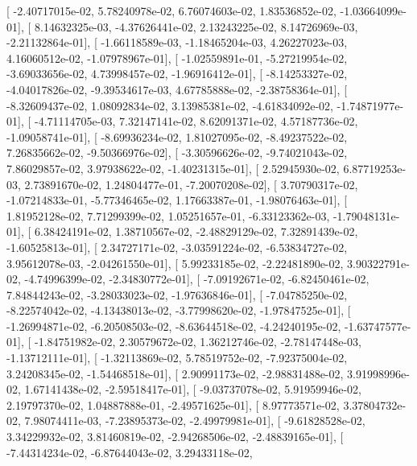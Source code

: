 \documentclass{article}
\begin{document}
       [ -2.40717015e-02,   5.78240978e-02,   6.76074603e-02,
          1.83536852e-02,  -1.03664099e-01],
       [  8.14632325e-03,  -4.37626441e-02,   2.13243225e-02,
          8.14726969e-03,  -2.21132864e-01],
       [ -1.66118589e-03,  -1.18465204e-03,   4.26227023e-03,
          4.16060512e-02,  -1.07978967e-01],
       [ -1.02559891e-01,  -5.27219954e-02,  -3.69033656e-02,
          4.73998457e-02,  -1.96916412e-01],
       [ -8.14253327e-02,  -4.04017826e-02,  -9.39534617e-03,
          4.67785888e-02,  -2.38758364e-01],
       [ -8.32609437e-02,   1.08092834e-02,   3.13985381e-02,
         -4.61834092e-02,  -1.74871977e-01],
       [ -4.71114705e-03,   7.32147141e-02,   8.62091371e-02,
          4.57187736e-02,  -1.09058741e-01],
       [ -8.69936234e-02,   1.81027095e-02,  -8.49237522e-02,
          7.26835662e-02,  -9.50366976e-02],
       [ -3.30596626e-02,  -9.74021043e-02,   7.86029857e-02,
          3.97938622e-02,  -1.40231315e-01],
       [  2.52945930e-02,   6.87719253e-03,   2.73891670e-02,
          1.24804477e-01,  -7.20070208e-02],
       [  3.70790317e-02,  -1.07214833e-01,  -5.77346465e-02,
          1.17663387e-01,  -1.98076463e-01],
       [  1.81952128e-02,   7.71299399e-02,   1.05251657e-01,
         -6.33123362e-03,  -1.79048131e-01],
       [  6.38424191e-02,   1.38710567e-02,  -2.48829129e-02,
          7.32891439e-02,  -1.60525813e-01],
       [  2.34727171e-02,  -3.03591224e-02,  -6.53834727e-02,
          3.95612078e-03,  -2.04261550e-01],
       [  5.99233185e-02,  -2.22481890e-02,   3.90322791e-02,
         -4.74996399e-02,  -2.34830772e-01],
       [ -7.09192671e-02,  -6.82450461e-02,   7.84844243e-02,
         -3.28033023e-02,  -1.97636846e-01],
       [ -7.04785250e-02,  -8.22574042e-02,  -4.13438013e-02,
         -3.77998620e-02,  -1.97847525e-01],
       [ -1.26994871e-02,  -6.20508503e-02,  -8.63644518e-02,
         -4.24240195e-02,  -1.63747577e-01],
       [ -1.84751982e-02,   2.30579672e-02,   1.36212746e-02,
         -2.78147448e-03,  -1.13712111e-01],
       [ -1.32113869e-02,   5.78519752e-02,  -7.92375004e-02,
          3.24208345e-02,  -1.54468518e-01],
       [  2.90991173e-02,  -2.98831488e-02,   3.91998996e-02,
          1.67141438e-02,  -2.59518417e-01],
       [ -9.03737078e-02,   5.91959946e-02,   2.19797370e-02,
          1.04887888e-01,  -2.49571625e-01],
       [  8.97773571e-02,   3.37804732e-02,   7.98074411e-03,
         -7.23895373e-02,  -2.49979981e-01],
       [ -9.61828528e-02,   3.34229932e-02,   3.81460819e-02,
         -2.94268506e-02,  -2.48839165e-01],
       [ -7.44314234e-02,  -6.87644043e-02,   3.29433118e-02,
\end{document}
